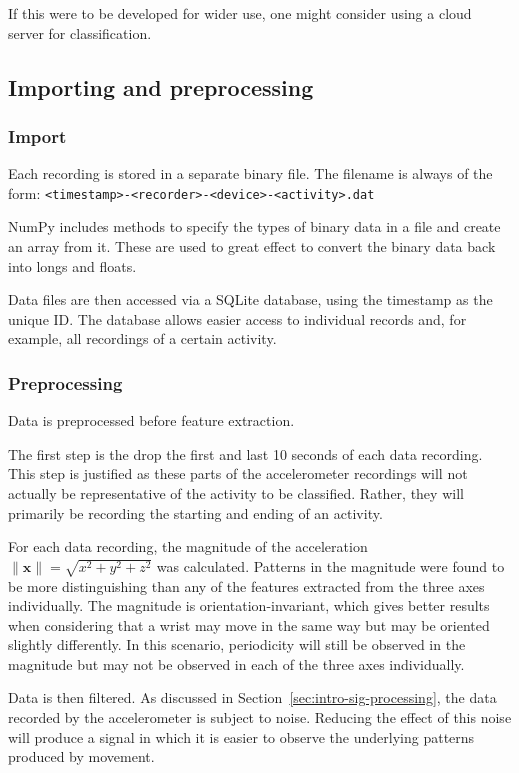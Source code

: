     If this were to be developed for wider use, one might consider using a cloud server for classification.
  
    \subsection{Importing and preprocessing}
      \label{sec:importing-and-preprocessing}
      \subsubsection{Import}
        Each recording is stored in a separate binary file. The filename is always of the form: \texttt{<timestamp>-<recorder>-<device>-<activity>.dat}
        
        NumPy includes methods to specify the types of binary data in a file and create an array from it. These are used to great effect to convert the binary data back into longs and floats.
        
        Data files are then accessed via a SQLite database, using the timestamp as the unique ID. The database allows easier access to individual records and, for example, all recordings of a certain activity.
      \subsubsection{Preprocessing}
        \label{sec:preprocessing}
        Data is preprocessed before feature extraction.
        
        The first step is the drop the first and last 10 seconds of each data recording. This step is justified as these parts of the accelerometer recordings will not actually be representative of the activity to be classified. Rather, they will primarily be recording the starting and ending of an activity.
        
        For each data recording, the magnitude of the acceleration $\|\mathbf{x}\| = \sqrt{x^2+y^2+z^2}$ was calculated. Patterns in the magnitude were found to be more distinguishing than any of the features extracted from the three axes individually. The magnitude is orientation-invariant, which gives better results when considering that a wrist may move in the same way but may be oriented slightly differently. In this scenario, periodicity will still be observed in the magnitude but may not be observed in each of the three axes individually.
        
        Data is then filtered. As discussed in Section~\ref{sec:intro-sig-processing}, the data recorded by the accelerometer is subject to noise. Reducing the effect of this noise will produce a signal in which it is easier to observe the underlying patterns produced by movement.
        
